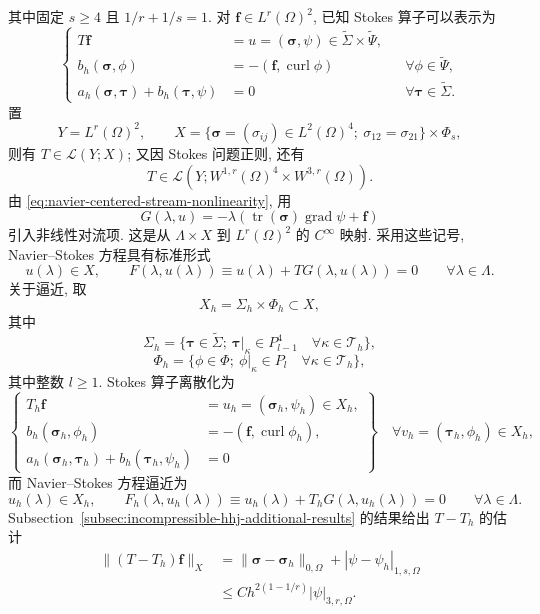 其中固定 $s\geq4$ 且 $1/r+1/s=1$.
对 $\boldsymbol f\in L^r(\Omega)^2$, 已知 Stokes 算子可以表示为
\[
\left\{
\begin{aligned}
T\boldsymbol f&=u=(\boldsymbol\sigma,\psi)
\in\widetilde\Sigma\times\widetilde\Psi,\\
b_h(\boldsymbol\sigma,\phi)
&=-(\boldsymbol f,\operatorname{curl}\phi)
&&\forall\phi\in\widetilde\Psi,\\
a_h(\boldsymbol\sigma,\boldsymbol\tau)
+b_h(\boldsymbol\tau,\psi)&=0
&&\forall\boldsymbol\tau\in\widetilde\Sigma.
\end{aligned}
\right.
\]
置
\[
Y=L^r(\Omega)^2,
\qquad
X=\{\boldsymbol\sigma=(\sigma_{ij})\in L^2(\Omega)^4;
\ \sigma_{12}=\sigma_{21}\}\times\Phi_s,
\]
则有 $T\in\mathcal L(Y;X)$; 又因 Stokes 问题正则, 还有
\[
T\in\mathcal L(Y;W^{1,r}(\Omega)^4\times W^{3,r}(\Omega)).
\]
由 \eqref{eq:navier-centered-stream-nonlinearity}, 用
\[
G(\lambda,u)
=-\lambda(\operatorname{tr}(\boldsymbol\sigma)
\operatorname{grad}\psi+\boldsymbol f)
\]
引入非线性对流项. 这是从 $\Lambda\times X$ 到 $L^r(\Omega)^2$
的 $C^\infty$ 映射. 采用这些记号, Navier--Stokes 方程具有标准形式
\begin{equation}\label{eq:navier-centered-gradient-tensor-continuous}
u(\lambda)\in X,
\qquad
F(\lambda,u(\lambda))
\equiv u(\lambda)+TG(\lambda,u(\lambda))=0
\qquad\forall\lambda\in\Lambda.
\end{equation}
关于逼近, 取
\[
X_h=\Sigma_h\times\Phi_h\subset X,
\]
其中
\[
\Sigma_h=\{\boldsymbol\tau\in\widetilde\Sigma;
\ \boldsymbol\tau|_\kappa\in P_{l-1}^4
\quad\forall\kappa\in\mathcal T_h\},
\]
\[
\Phi_h=\{\phi\in\Phi;
\ \phi|_\kappa\in P_l
\quad\forall\kappa\in\mathcal T_h\},
\]
其中整数 $l\geq1$. Stokes 算子离散化为
\[
\left\{
\begin{aligned}
T_h\boldsymbol f&=u_h=(\boldsymbol\sigma_h,\psi_h)\in X_h,\\
b_h(\boldsymbol\sigma_h,\phi_h)
&=-(\boldsymbol f,\operatorname{curl}\phi_h),\\
a_h(\boldsymbol\sigma_h,\boldsymbol\tau_h)
+b_h(\boldsymbol\tau_h,\psi_h)&=0
\end{aligned}
\right\}
\quad
\forall v_h=(\boldsymbol\tau_h,\phi_h)\in X_h,
\]
而 Navier--Stokes 方程逼近为
\begin{equation}\label{eq:navier-centered-gradient-tensor-discrete}
u_h(\lambda)\in X_h,
\qquad
F_h(\lambda,u_h(\lambda))
\equiv u_h(\lambda)+T_hG(\lambda,u_h(\lambda))=0
\qquad\forall\lambda\in\Lambda.
\end{equation}
Subsection~\ref{subsec:incompressible-hhj-additional-results} 的结果给出
$T-T_h$ 的估计
\[
\begin{aligned}
\|(T-T_h)\boldsymbol f\|_X
&=\|\boldsymbol\sigma-\boldsymbol\sigma_h\|_{0,\Omega}
+|\psi-\psi_h|_{1,s,\Omega}\\
&\leq Ch^{2(1-1/r)}|\psi|_{3,r,\Omega}.
\end{aligned}
\]

